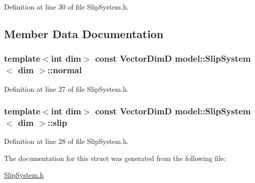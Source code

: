 Definition at line 30 of file Slip\+System.\+h.



\subsection{Member Data Documentation}
\hypertarget{structmodel_1_1_slip_system_a090561749e7b4a268d9fed486b8047fe}{}
\subsubsection[{normal}]{\setlength{\rightskip}{0pt plus 5cm}template$<$int dim$>$ const {\bf Vector\+Dim\+D} {\bf model\+::\+Slip\+System}$<$ {\bf dim} $>$\+::normal}\label{structmodel_1_1_slip_system_a090561749e7b4a268d9fed486b8047fe}


Definition at line 27 of file Slip\+System.\+h.

\hypertarget{structmodel_1_1_slip_system_a56572818743fe20aa95de4b8b6b7bbe6}{}
\subsubsection[{slip}]{\setlength{\rightskip}{0pt plus 5cm}template$<$int dim$>$ const {\bf Vector\+Dim\+D} {\bf model\+::\+Slip\+System}$<$ {\bf dim} $>$\+::slip}\label{structmodel_1_1_slip_system_a56572818743fe20aa95de4b8b6b7bbe6}


Definition at line 28 of file Slip\+System.\+h.



The documentation for this struct was generated from the following file\+:\begin{DoxyCompactItemize}
\item 
\hyperlink{_slip_system_8h}{Slip\+System.\+h}\end{DoxyCompactItemize}
